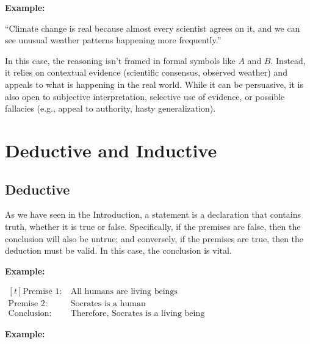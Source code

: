 \documentclass[12pt,a4paper,openany]{article}
\begin{document}
\textbf{Example:}

“Climate change is real because almost every scientist agrees on it, and we can see unusual weather patterns happening more frequently.”

In this case, the reasoning isn't framed in formal symbols like $A$ and $B$. Instead, it relies on contextual evidence (scientific consensus, observed weather) and appeals to what is happening in the real world. While it can be persuasive, it is also open to subjective interpretation, selective use of evidence, or possible fallacies (e.g., appeal to authority, hasty generalization).


\section{Deductive and Inductive}


\subsection{Deductive}\label{deductive}

As we have seen in the Introduction, a statement is a
declaration that contains truth, whether it is true or false.
Specifically, if the premises are false, then the conclusion will also
be untrue; and conversely, if the premises are true, then the
deduction must be valid. In this case, the conclusion is vital.

\textbf{Example:}

\noindent
\(
\begin{aligned}[t]
 \text{Premise 1:} \ & \text{All humans are living beings} \\
 \text{Premise 2:} \ & \text{Socrates is a human} \\
 \text{Conclusion:} \ & \text{Therefore, Socrates is a living being}
\end{aligned}
\)

\textbf{Example:}
\end{document}
